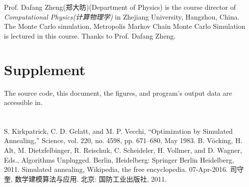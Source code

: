 \documentclass[10.5pt,a4paper]{article}
\begin{document}
Prof. Dafang Zheng(郑大昉)(Department of Physics) is the course director of \textit{Computational Physics(计算物理学)} in Zhejiang University, Hangzhou, China. The Monte Carlo simulation, Metropolis Markov Chain Monte Carlo Simulation is lectured in this course. Thanks to Prof. Dafang Zheng.


\section{Supplement}
The source code, this document, the figures, and program's output data are accessible in.
\section*{}
\begin{thebibliography}{ieee}
S. Kirkpatrick, C. D. Gelatt, and M. P. Vecchi, “Optimization by Simulated Annealing,” Science, vol. 220, no. 4598, pp. 671–680, May 1983.
B. Vöcking, H. Alt, M. Dietzfelbinger, R. Reischuk, C. Scheideler, H. Vollmer, and D. Wagner, Eds., Algorithms Unplugged. Berlin, Heidelberg: Springer Berlin Heidelberg, 2011.
Simulated annealing, Wikipedia, the free encyclopedia. 07-Apr-2016.
司守奎, 数学建模算法与应用. 北京: 国防工业出版社, 2011.
\end{thebibliography}
\end{document}
